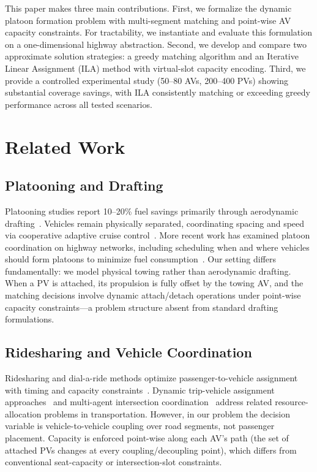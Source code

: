 \documentclass[conference]{IEEEtran}
\begin{document}
This paper makes three main contributions. First, we formalize the dynamic platoon formation problem with multi-segment matching and point-wise AV capacity constraints. For tractability, we instantiate and evaluate this formulation on a one-dimensional highway abstraction. Second, we develop and compare two approximate solution strategies: a greedy matching algorithm and an Iterative Linear Assignment (ILA) method with virtual-slot capacity encoding. Third, we provide a controlled experimental study (50--80 AVs, 200--400 PVs) showing substantial coverage savings, with ILA consistently matching or exceeding greedy performance across all tested scenarios.%

\section{Related Work}

\subsection{Platooning and Drafting}

Platooning studies report 10--20\% fuel savings primarily through aerodynamic drafting~\cite{tsugawa2016review,bergenhem2012overview,shladover2009cooperative}. Vehicles remain physically separated, coordinating spacing and speed via cooperative adaptive cruise control~\cite{ploeg2011design}. More recent work has examined platoon coordination on highway networks, including scheduling when and where vehicles should form platoons to minimize fuel consumption~\cite{drexl2012synchronization}. Our setting differs fundamentally: we model physical towing rather than aerodynamic drafting. When a PV is attached, its propulsion is fully offset by the towing AV, and the matching decisions involve dynamic attach/detach operations under point-wise capacity constraints---a problem structure absent from standard drafting formulations.

\subsection{Ridesharing and Vehicle Coordination}

Ridesharing and dial-a-ride methods optimize passenger-to-vehicle assignment with timing and capacity constraints~\cite{furuhata2013ridesharing,agatz2012optimization,alonso2017demand,cordeau2007dial}. Dynamic trip-vehicle assignment approaches~\cite{alonso2017demand} and multi-agent intersection coordination~\cite{dresner2008multiagent} address related resource-allocation problems in transportation. However, in our problem the decision variable is vehicle-to-vehicle coupling over road segments, not passenger placement. Capacity is enforced point-wise along each AV's path (the set of attached PVs changes at every coupling/decoupling point), which differs from conventional seat-capacity or intersection-slot constraints.
\end{document}
